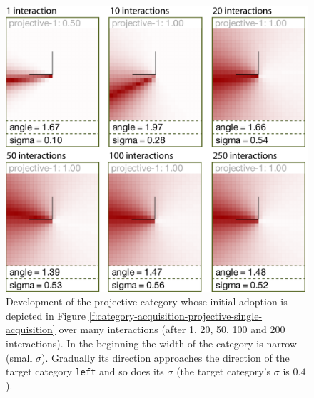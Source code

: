 \begin{figure}
\begin{center}
\includegraphics[width=0.8\columnwidth]{figs/category-acquisition-projective-category-development-over-time.png}
\end{center}
\caption[Development of a projective category]{Development of the projective category whose initial adoption is depicted in 
Figure \ref{f:category-acquisition-projective-single-acquisition} over many interactions 
(after 1, 20, 50, 100 and 200 interactions). In the beginning the width of the category is narrow (small $\sigma$). Gradually 
its direction approaches the direction of the target category {\footnotesize\tt left} and so does its $\sigma$ 
(the target category's $\sigma$ is $0.4$).}
\label{f:category-acquisition-projective-development-over-time}
\end{figure}

